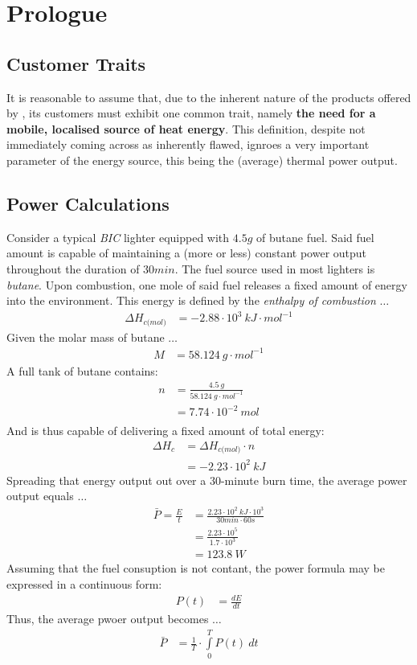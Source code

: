 \section{Prologue}
\subsection{Customer Traits}
It is reasonable to assume that, due to the inherent nature of the products offered by \fw, its customers must
exhibit one common trait, namely \textbf{the need for a mobile, localised source of heat energy}.
This definition, despite not immediately coming across as inherently flawed, ignroes a very important parameter of the
energy source, this being the (average) thermal power output. \\[\baselineskip]
\subsection{Power Calculations}
Consider a typical \textit{BIC} lighter equipped with $4.5g$ of butane fuel. Said fuel amount is capable of maintaining
a (more or less) constant power output throughout the duration of $30min$.
The fuel source used in most lighters is \textit{butane}. Upon combustion, one mole of said fuel
releases a fixed amount of energy into the environment. This energy is defined by the \textit{enthalpy of combustion} $\dots$
\begin{align*}
	\Delta H_{c\textit{(mol)}} &= -2.88 \cdot 10^3 \: kJ \cdot mol^{-1}
\end{align*}
Given the molar mass of butane $\dots$
\begin{align*}
	M &= 58.124 \: g \cdot mol^{-1}
\end{align*}
A full tank of butane contains:
\begin{align*}
	n &= \frac{4.5 \: g}{58.124 \: g \cdot mol^{-1}} \\
	  &= 7.74 \cdot 10^{-2} \: mol \\
\end{align*}
And is thus capable of delivering a fixed amount of total energy:
\begin{align*}
	\Delta H_c &= \Delta H_{c\textit{(mol)}} \cdot n \\
		   &= -2.23 \cdot 10^2 \: kJ
\end{align*}
Spreading that energy output out over a $30$-minute burn time, the average power output equals $\dots$
\begin{align*}
	\bar{P} = \frac{E}{t} &= \frac{2.23 \cdot 10^2 \: kJ \cdot 10^3}{30min \cdot 60s} \\
			&= \frac{2.23 \cdot 10^5}{1.7 \cdot 10^3} \\
			&= 123.8 \: W
\end{align*}
Assuming that the fuel consuption is not contant, the power formula may be expressed in a continuous form:
\begin{align*}
	P(t) &= \frac{dE}{dt}
\end{align*}
Thus, the average pwoer output becomes $\dots$
\begin{align*}
	\bar{P} &= \frac{1}{T} \cdot \int\limits_{0}^{T} P(t) \: dt
\end{align*}
